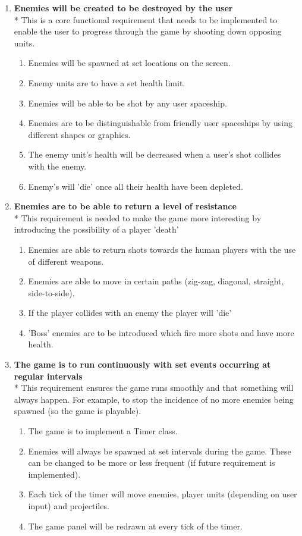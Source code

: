 \begin{enumerate}
\item \textbf{Enemies will be created to be destroyed by the user}
\\* This is a core functional requirement that needs to be implemented to enable the user to progress through the game by shooting down opposing units.
\begin{enumerate}
\item Enemies will be spawned at set locations on the screen.
\item Enemy units are to have a set health limit.
\item Enemies will be able to be shot by any user spaceship.
\item Enemies are to be distinguishable from friendly user spaceships by using different shapes or graphics.
\item The enemy unit's health will be decreased when a user's shot collides with the enemy.
\item Enemy's will 'die' once all their health have been depleted.
\end{enumerate}

\item \textbf{Enemies are to be able to return a level of resistance}
\\* This requirement is needed to make the game more interesting by introducing the possibility of a player 'death'
\begin{enumerate}
\item Enemies are able to return shots towards the human players with the use of different weapons.
\item Enemies are able to move in certain paths (zig-zag, diagonal, straight, side-to-side).
\item If the player collides with an enemy the player will 'die'
\item 'Boss' enemies are to be introduced which fire more shots and have more health.
\end{enumerate}

\item \textbf{The game is to run continuously with set events occurring at regular intervals}
\\* This requirement ensures the game runs smoothly and that something will always happen. For example, to stop the incidence of no more enemies being spawned (so the game is playable).
\begin{enumerate}
\item The game is to implement a Timer class.
\item Enemies will always be spawned at set intervals during the game. These can be changed to be more or less frequent (if future requirement is implemented).
\item Each tick of the timer will move enemies, player units (depending on user input) and projectiles.
\item The game panel will be redrawn at every tick of the timer.
\end{enumerate}


\end{enumerate}
